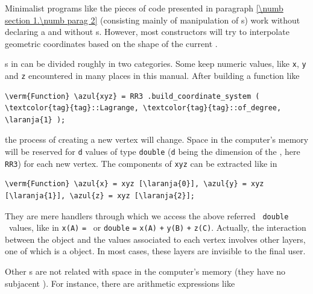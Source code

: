 Minimalist programs like the pieces of code presented in paragraph
\ref{\numb section 1.\numb parag 2} (consisting mainly of manipulation of
{\small\tt{}}s) work without declaring a {\small\tt{}}
and without {\small\tt{}}s.
However, most {\small\tt{}} constructors will try to interpolate geometric coordinates
based on the shape of the current {\small\tt{}}.

{\small\tt{}}s in {\maniFEM} can be divided roughly in two categories.
Some keep numeric values, like {\small\tt x}, {\small\tt y} and {\small\tt z}
encountered in many places in this manual.
After building a function like

\begin{Verbatim}[commandchars=\\\{\},formatcom=\small\tt,baselinestretch=0.94]
   \verm{Function} \azul{xyz} = RR3 .build_coordinate_system ( \textcolor{tag}{tag}::Lagrange, \textcolor{tag}{tag}::of_degree, \laranja{1} );
\end{Verbatim}

\noindent the process of creating a new vertex will change.
Space in the computer's memory will be reserved for {\small\tt d} values of type
{\small\tt double} ({\small\tt d} being the dimension of the {\small\tt{}},
here {\small\tt RR3}) for each new vertex.
The components of {\small\tt xyz} can be extracted like in

\begin{Verbatim}[commandchars=\\\{\},formatcom=\small\tt,baselinestretch=0.94]
   \verm{Function} \azul{x} = xyz [\laranja{0}], \azul{y} = xyz [\laranja{1}], \azul{z} = xyz [\laranja{2}];
\end{Verbatim}

\noindent They are mere handlers through which we access the above referred \ {\small\tt double}
\ values, like in {\small\tt x(A)} {\small\tt =} {\small\tt {}}\ or
{\small\tt double} {\small\tt {}} {\small\tt =} {\small\tt x(A)} {\small\tt +}
{\small\tt y(B)} {\small\tt +} {\small\tt z(C)}.
Actually, the interaction between the {\small\tt{}} object and the values
associated to each vertex involves other layers, one of which is a {\small\tt{}}
object.
In most cases, these layers are invisible to the final user.

Other {\small\tt{}}s are not related with space in the computer's memory
(they have no subjacent {\small\tt{}}).
For instance, there are arithmetic expressions like 

